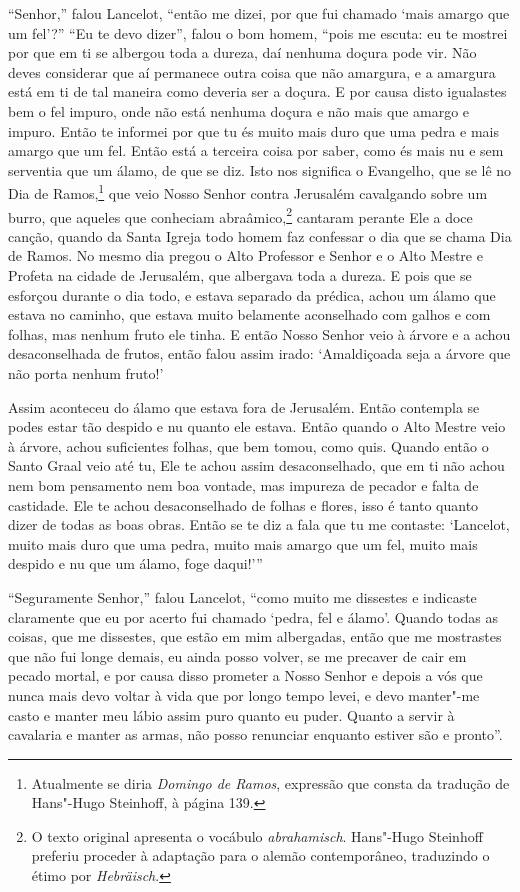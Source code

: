 “Senhor,” falou Lancelot, “então me dizei, por que fui chamado ‘mais amargo que
um fel’?” “Eu te devo dizer”, falou o bom homem, “pois me escuta: eu te
mostrei por que em ti se albergou toda a dureza, daí nenhuma doçura pode vir.
Não deves considerar que aí permanece outra coisa que não amargura, e a
amargura está em ti de tal maneira como deveria ser a doçura. E por causa disto
igualastes bem o fel impuro, onde não está nenhuma doçura e não mais que amargo
e impuro. Então te informei por que tu és muito mais duro que uma pedra e mais
amargo que um fel. Então está a terceira coisa por saber, como és mais nu e sem
serventia que um álamo, de que se diz. Isto nos significa o Evangelho, que se
lê no Dia de Ramos,\footnote{ Atualmente se diria \textit{Domingo de Ramos},
expressão que consta da tradução de Hans"-Hugo Steinhoff, à página 139. 
 } que veio Nosso Senhor contra Jerusalém cavalgando sobre um burro, que
aqueles que conheciam abraâmico,\footnote{ O texto original apresenta o vocábulo
\textit{abrahamisch}. Hans"-Hugo Steinhoff preferiu proceder à
adaptação para o alemão contemporâneo, traduzindo o étimo por
\textit{Hebräisch}.} cantaram perante Ele a doce
canção, quando da Santa Igreja todo homem faz confessar o dia que se chama Dia
de Ramos. No mesmo dia pregou o Alto Professor e Senhor e o Alto Mestre e
Profeta na cidade de Jerusalém, que albergava toda a dureza. E pois que se
esforçou durante o dia todo, e estava separado da prédica, achou um álamo que
estava no caminho, que estava muito belamente aconselhado com galhos e com
folhas, mas nenhum fruto ele tinha. E então Nosso Senhor veio à árvore e a
achou desaconselhada de frutos, então falou assim irado: ‘Amaldiçoada seja a
árvore que não porta nenhum fruto!’ 

Assim aconteceu do álamo que estava fora de Jerusalém. Então contempla se podes
estar tão despido e nu quanto ele estava. Então quando o Alto Mestre veio à
árvore, achou suficientes folhas, que bem tomou, como quis. Quando então o
Santo Graal veio até tu, Ele te achou assim desaconselhado, que em ti não achou
nem bom pensamento nem boa vontade, mas impureza de pecador e falta de
castidade. Ele te achou desaconselhado de folhas e flores, isso é tanto quanto
dizer de todas as boas obras. Então se te diz a fala que tu me contaste:
‘Lancelot, muito mais duro que uma pedra, muito mais amargo que um fel, muito
mais despido e nu que um álamo, foge daqui!'” 

``Seguramente Senhor,” falou Lancelot, “como muito me dissestes e indicaste
claramente que eu por acerto fui chamado ‘pedra, fel e álamo’. Quando todas as
coisas, que me dissestes, que estão em mim albergadas, então que me mostrastes
que não fui longe demais, eu ainda posso volver, se me precaver de cair em
pecado mortal, e por causa disso prometer a Nosso Senhor e depois a vós que
nunca mais devo voltar à vida que por longo tempo levei, e devo manter"-me casto
e  manter meu lábio assim puro quanto eu puder. Quanto a servir à cavalaria
e manter as armas, não posso renunciar enquanto estiver são e pronto”.

